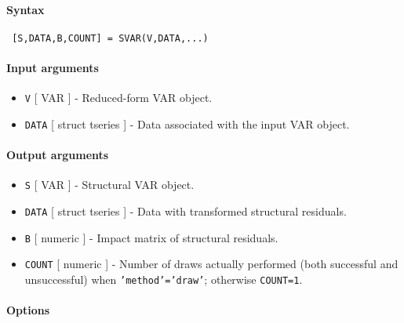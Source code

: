 


	\paragraph{Syntax}
 
 \begin{verbatim}
 [S,DATA,B,COUNT] = SVAR(V,DATA,...)
 \end{verbatim}
 
 \paragraph{Input arguments}
 
 \begin{itemize}
 \item
   \texttt{V} {[} VAR {]} - Reduced-form VAR object.
 \item
   \texttt{DATA} {[} struct \textbar{} tseries {]} - Data associated with
   the input VAR object.
 \end{itemize}
 
 \paragraph{Output arguments}
 
 \begin{itemize}
 \item
   \texttt{S} {[} VAR {]} - Structural VAR object.
 \item
   \texttt{DATA} {[} struct \textbar{} tseries {]} - Data with
   transformed structural residuals.
 \item
   \texttt{B} {[} numeric {]} - Impact matrix of structural residuals.
 \item
   \texttt{COUNT} {[} numeric {]} - Number of draws actually performed
   (both successful and unsuccessful) when \texttt{'method'='draw'};
   otherwise \texttt{COUNT=1}.
 \end{itemize}
 
 \paragraph{Options}
 
